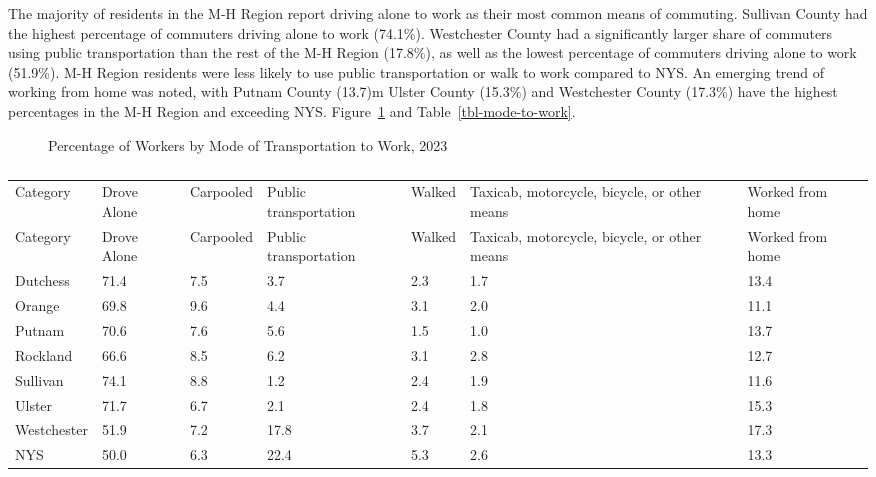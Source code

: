 \documentclass[
  english,
  letterpaper,
]{report}
\begin{document}
The majority of residents in the M-H Region report driving alone to work
as their most common means of commuting. Sullivan County had the highest
percentage of commuters driving alone to work (74.1\%). Westchester
County had a significantly larger share of commuters using public
transportation than the rest of the M-H Region (17.8\%), as well as the
lowest percentage of commuters driving alone to work (51.9\%). M-H
Region residents were less likely to use public transportation or walk
to work compared to NYS. An emerging trend of working from home was
noted, with Putnam County (13.7)m Ulster County (15.3\%) and Westchester
County (17.3\%) have the highest percentages in the M-H Region and
exceeding NYS. Figure~\ref{fig-mode-to-work} and
Table~\ref{tbl-mode-to-work}.

\begin{figure}


\caption{\label{fig-mode-to-work}Percentage of Workers by Mode of
Transportation to Work, 2023}

\end{figure}%

\begin{longtable}[]{@{}lllllll@{}}

\caption{\label{tbl-mode-to-work}Percentage of Workers by Mode of
Transportation to Work, 2023}

\tabularnewline

\caption{}\label{T_359a5}\tabularnewline
\toprule\noalign{}
Category & Drove Alone & Carpooled & Public transportation & Walked &
Taxicab, motorcycle, bicycle, or other means & Worked from home \\
\midrule\noalign{}
\endfirsthead
\toprule\noalign{}
Category & Drove Alone & Carpooled & Public transportation & Walked &
Taxicab, motorcycle, bicycle, or other means & Worked from home \\
\midrule\noalign{}
\endhead
\bottomrule\noalign{}
\endlastfoot
Dutchess & 71.4 & 7.5 & 3.7 & 2.3 & 1.7 & 13.4 \\
Orange & 69.8 & 9.6 & 4.4 & 3.1 & 2.0 & 11.1 \\
Putnam & 70.6 & 7.6 & 5.6 & 1.5 & 1.0 & 13.7 \\
Rockland & 66.6 & 8.5 & 6.2 & 3.1 & 2.8 & 12.7 \\
Sullivan & 74.1 & 8.8 & 1.2 & 2.4 & 1.9 & 11.6 \\
Ulster & 71.7 & 6.7 & 2.1 & 2.4 & 1.8 & 15.3 \\
Westchester & 51.9 & 7.2 & 17.8 & 3.7 & 2.1 & 17.3 \\
NYS & 50.0 & 6.3 & 22.4 & 5.3 & 2.6 & 13.3 \\

\end{longtable}
\end{document}
